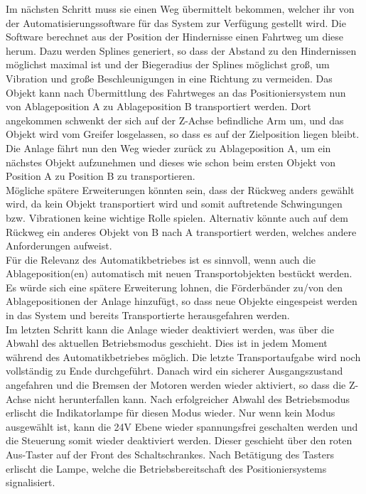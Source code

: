 \documentclass[../Bachelorarbeit.tex]{subfiles}
\begin{document}
Im nächsten Schritt muss sie einen Weg übermittelt bekommen, welcher ihr von der Automatisierungssoftware für das System zur Verfügung gestellt wird. Die Software berechnet aus der Position der Hindernisse einen Fahrtweg um diese herum. Dazu werden Splines generiert, so dass der Abstand zu den Hindernissen möglichst maximal ist und der Biegeradius der Splines möglichst groß, um Vibration und große Beschleunigungen in eine Richtung zu vermeiden. Das Objekt kann nach Übermittlung des Fahrtweges an das Positioniersystem nun von Ablageposition A zu Ablageposition B transportiert werden. 
Dort angekommen schwenkt der sich auf der Z-Achse befindliche Arm um, und das Objekt wird vom Greifer losgelassen, so dass es auf der Zielposition liegen bleibt. Die Anlage fährt nun den Weg wieder zurück zu Ablageposition A, um ein nächstes Objekt aufzunehmen und dieses wie schon beim ersten Objekt von Position A zu Position B zu transportieren.\\
Mögliche spätere Erweiterungen könnten sein, dass der Rückweg anders gewählt wird, da kein Objekt transportiert wird und somit auftretende Schwingungen bzw. Vibrationen keine wichtige Rolle spielen. Alternativ könnte auch auf dem Rückweg ein anderes Objekt von B nach A transportiert werden, welches andere Anforderungen aufweist.\\
Für die Relevanz des Automatikbetriebes ist es sinnvoll, wenn auch die Ablageposition(en) automatisch mit neuen Transportobjekten bestückt werden. Es würde sich eine spätere Erweiterung lohnen, die Förderbänder zu/von den Ablagepositionen der Anlage hinzufügt, so dass neue Objekte eingespeist werden in das System und bereits Transportierte herausgefahren werden.\\
Im letzten Schritt kann die Anlage wieder deaktiviert werden, was über die Abwahl des aktuellen Betriebsmodus geschieht. Dies ist in jedem Moment während des Automatikbetriebes möglich. Die letzte Transportaufgabe wird noch vollständig zu Ende durchgeführt. Danach wird ein sicherer Ausgangszustand angefahren und die Bremsen der Motoren werden wieder aktiviert, so dass die Z-Achse nicht herunterfallen kann. Nach erfolgreicher Abwahl des Betriebsmodus erlischt die Indikatorlampe für diesen Modus wieder. Nur wenn kein Modus ausgewählt ist, kann die 24V Ebene wieder spannungsfrei geschalten werden und die Steuerung somit wieder deaktiviert werden. Dieser geschieht über den roten Aus-Taster auf der Front des Schaltschrankes. Nach Betätigung des Tasters erlischt die Lampe, welche die Betriebsbereitschaft des Positioniersystems signalisiert.\\
\end{document}
